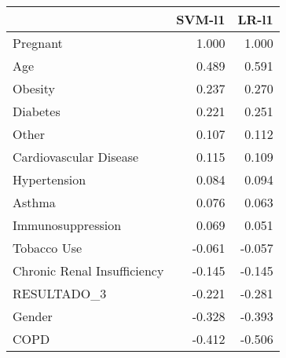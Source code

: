 \begin{tabular}{lrr}
\toprule
{} &  SVM-l1 &  LR-l1 \\
\midrule
Pregnant                    &   1.000 &  1.000 \\
Age                         &   0.489 &  0.591 \\
Obesity                     &   0.237 &  0.270 \\
Diabetes                    &   0.221 &  0.251 \\
Other                       &   0.107 &  0.112 \\
Cardiovascular Disease      &   0.115 &  0.109 \\
Hypertension                &   0.084 &  0.094 \\
Asthma                      &   0.076 &  0.063 \\
Immunosuppression           &   0.069 &  0.051 \\
Tobacco Use                 &  -0.061 & -0.057 \\
Chronic Renal Insufficiency &  -0.145 & -0.145 \\
RESULTADO\_3                 &  -0.221 & -0.281 \\
Gender                      &  -0.328 & -0.393 \\
COPD                        &  -0.412 & -0.506 \\
\bottomrule
\end{tabular}
